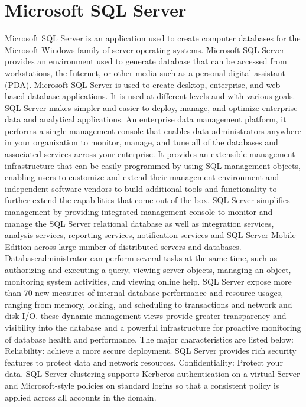 \section{Microsoft SQL Server}
Microsoft SQL Server is an application used to create computer databases for the Microsoft Windows family of server operating systems. Microsoft SQL Server provides an environment used to generate database that can be accessed from workstations, the Internet, or other media such as a personal digital assistant (PDA). Microsoft SQL Server is used to create desktop, enterprise, and web-based database applications. It is used at different levels and with various goals.
SQL Server makes simpler and easier to deploy, manage, and optimize enterprise data and analytical applications. An enterprise data management platform, it performs a single management console that enables data administrators anywhere in your organization to monitor, manage, and tune all of the databases and associated services across your enterprise. It provides an extensible management infrastructure that can be easily programmed by using SQL management objects, enabling users to customize and extend their management environment and independent software vendors to build additional tools and functionality to further extend the capabilities that come out of the box.
SQL Server simplifies management by providing integrated management console to monitor and manage the SQL Server relational database as well as integration services, analysis services, reporting services, notification services and SQL Server Mobile Edition across large number of distributed servers and databases. Databaseadministrator can perform several tasks at the same time, such as authorizing and executing a query, viewing server objects, managing an object, monitoring system activities, and viewing online help.
SQL Server expose more than 70 new measures of internal database performance and resource usages, ranging from memory, locking, and scheduling to transactions and network and disk I/O. these dynamic management views provide greater transparency and visibility into the database and a powerful infrastructure for proactive monitoring of database health and performance. The major characteristics are listed below:
Reliability: achieve a more secure deployment. SQL Server provides rich security features to protect data and network resources.
Confidentiality: Protect your data. SQL Server clustering supports Kerberos authentication on a virtual Server and Microsoft-style policies on standard logins so that a consistent policy is applied across all accounts in the domain.
